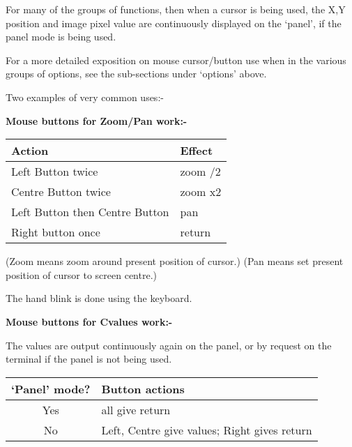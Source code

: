 \begin{small}
{{ For many of the groups of functions, then when a cursor is being
 used, the X,Y position and image pixel value are continuously
 displayed on the `panel', if the panel mode is being used.

 For a more detailed exposition on mouse cursor/button use when
 in the various groups of options, see the sub-sections under 
 `options' above.

 Two examples of very common uses:-
   
{\bf \hspace*{4ex}      Mouse buttons for Zoom/Pan work:- }

\hspace*{4ex}\begin{tabular}{|l|l|}\hline
Action                         & Effect \\ \hline
Left Button twice              & zoom /2 \\
Centre Button twice            & zoom x2 \\
Left Button then Centre Button & pan \\
Right button once              & return \\ \hline
\end{tabular}
                                                                              
(Zoom means zoom around present position of cursor.) \newline
(Pan means set present position of cursor to screen centre.)
                                                                              
                                                                              
The hand blink is done using the keyboard.
                                                                              
{\bf \hspace*{4ex}      Mouse buttons for Cvalues work:- }

The values are output continuously again on the panel, or by
request on the terminal if the panel is not being used.

\hspace*{4ex}\begin{tabular}{|c|l|} \hline
      `Panel' mode?  &  Button actions \\ \hline
           Yes       &  all give return \\
           No        &  Left, Centre give values; Right gives return \\
\hline\end{tabular}
                                                                              
}}
\end{small}
